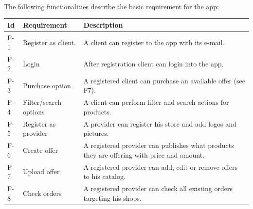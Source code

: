 The following functionalities describe the basic requirement for the \gls{app}:

    \begin{tabularx}{\textwidth}{llX}

    \toprule
    Id & Requirement & Description  \\
    \midrule
    F-1 & Register as \gls{client}. & A \gls{client} can register to the app with its e-mail.\\
    F-2 & Login & After registration \gls{client} can login into the app. \\
    F-3 & Purchase option & A registered \gls{client} can purchase an available offer (see F7).\\
    F-4 & Filter/search options & A \gls{client} can perform filter and search actions for products.\\
    F-5 & Register as \gls{provider} & A \gls{provider} can register his store and add logos and pictures.\\
    F-6 & Create offer & A registered \gls{provider} can publishes what products they are offering with price 
    and amount. \\
    F-7 & Upload offer & A registered \gls{provider} can add, edit or remove offers to his catalog.\\
    F-8 & Check orders & A registered \gls{provider} can check all existing orders targeting his shops.\\
    \bottomrule
    \end{tabularx}

